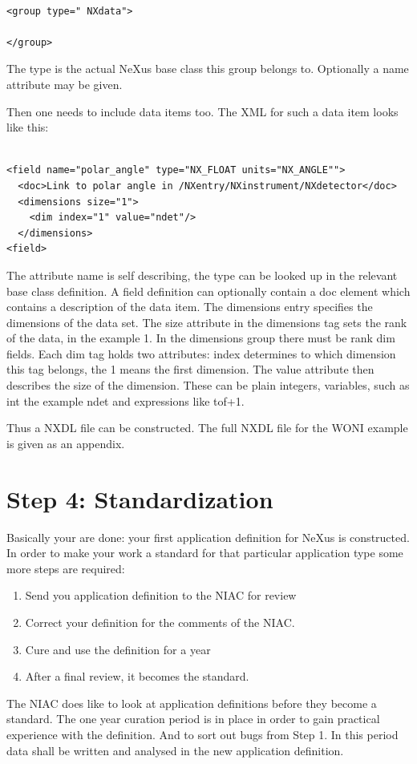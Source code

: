 \documentclass[a4paper]{article}\usepackage[dvips]{graphicx}
\begin{document}
\begin{verbatim}

<group type=" NXdata">

</group>
\end{verbatim}
 
The type is the actual NeXus base class this group belongs to. Optionally a name attribute may be 
given.


Then one needs to include data items too. The XML for such a data item looks like this:


\begin{verbatim}

<field name="polar_angle" type="NX_FLOAT units="NX_ANGLE"">
  <doc>Link to polar angle in /NXentry/NXinstrument/NXdetector</doc>
  <dimensions size="1">
    <dim index="1" value="ndet"/>
  </dimensions>
<field>
\end{verbatim}

The attribute name is self describing, the type can be looked up in the relevant base class 
definition. A field definition can optionally contain a doc element which contains a description of 
the data item. The dimensions entry specifies the dimensions of the data set. The size attribute in the 
dimensions tag sets the rank of the data, in the example 1. In the dimensions group there must be rank 
dim fields. Each dim tag holds two attributes: index determines to which dimension this tag belongs, the 1 means 
 the first dimension. The value attribute then describes the size of the dimension. These can be plain integers, 
variables, such as int the example ndet and expressions like tof+1. 
  


Thus a NXDL file can be constructed. The full NXDL file for the WONI example is given as an appendix.




\section{Step 4: Standardization }

Basically your are done: your first application definition for NeXus is constructed. In order to 
make your work a standard for that particular application type some more steps are required:


\begin{enumerate}\item Send you application definition to the NIAC for review
\item Correct your definition for the comments of the NIAC.
\item Cure and use the definition for a year
\item After a final review, it becomes the standard.
\end{enumerate}The NIAC does like to look at application definitions before they become a standard. The one year 
curation period is in place in order to gain practical experience with the definition. And to sort 
out bugs from Step 1.  In this period data shall be written and analysed in the new application definition. 
\end{document}
